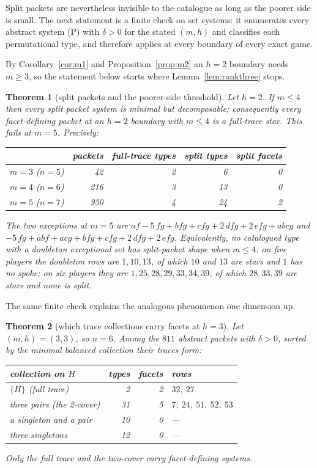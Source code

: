 \documentclass[11pt]{article}
\newtheorem{theorem}{Theorem}
\begin{document}
Split packets are nevertheless invisible to the catalogue as long as the poorer
side is small.  The next statement is a finite check on set systems: it
enumerates every abstract system (P) with $\delta>0$ for the stated $(m,h)$ and
classifies each permutational type, and therefore applies at every boundary of
every exact game.

By Corollary~\ref{cor:m1} and Proposition~\ref{prop:m2} an $h=2$ boundary
needs $m\ge3$, so the statement below starts where
Lemma~\ref{lem:rankthree} stops.

\begin{theorem}[split packets and the poorer-side threshold]\label{sel:thm:mthr}
Let $h=2$.  If $m\le4$ then every split packet system is minimal but
decomposable; consequently every facet-defining packet at an $h=2$ boundary
with $m\le4$ is a full-trace star.  This fails at $m=5$.  Precisely:
\begin{center}
\begin{tabular}{lrrrr}
\toprule
 & packets & full-trace types & split types & split facets\\
\midrule
$m=3$ ($n=5$) &  42 & 2 &  6 & 0\\
$m=4$ ($n=6$) & 216 & 3 & 13 & 0\\
$m=5$ ($n=7$) & 950 & 4 & 24 & 2\\
\bottomrule
\end{tabular}
\end{center}
The two exceptions at $m=5$ are
$af-5\,fg+bfg+cfg+2\,dfg+2\,efg+abcg$ and
$-5\,fg+abf+acg+bfg+cfg+2\,dfg+2\,efg$.
Equivalently, no catalogued type with a doubleton exceptional set has
split-packet shape when $m\le4$: on five players the doubleton rows are
$1,10,13$, of which $10$ and $13$ are stars and $1$ has no spoke; on six players
they are $1,25,28,29,33,34,39$, of which $28,33,39$ are stars and none is split.
\end{theorem}

The same finite check explains the analogous phenomenon one dimension up.

\begin{theorem}[which trace collections carry facets at $h=3$]\label{sel:thm:h3}
Let $(m,h)=(3,3)$, so $n=6$.  Among the $811$ abstract packets with
$\delta>0$, sorted by the minimal balanced collection their traces form:
\begin{center}
\begin{tabular}{lrrl}
\toprule
collection on $H$ & types & facets & rows\\
\midrule
$\{H\}$ (full trace)       &  2 & 2 & $32,\ 27$\\
three pairs (the 2-cover)   & 31 & 5 & $7,\ 24,\ 51,\ 52,\ 53$\\
a singleton and a pair      & 10 & 0 & ---\\
three singletons            & 12 & 0 & ---\\
\bottomrule
\end{tabular}
\end{center}
Only the full trace and the two-cover carry facet-defining systems.
\end{theorem}
\end{document}
